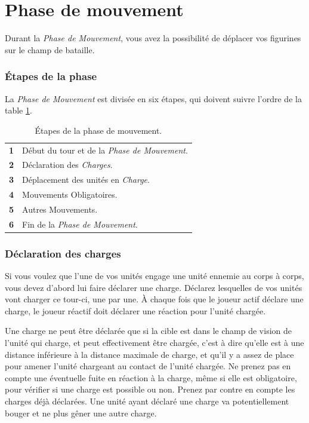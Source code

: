 
\part{Phase de mouvement}

Durant la \emph{Phase de Mouvement}, vous avez la possibilité de déplacer vos figurines sur le champ de bataille.

\section{Étapes de la phase}

La \emph{Phase de Mouvement} est divisée en six étapes, qui doivent suivre l'ordre de la table \ref{table/etapes_mouvement}.

\begin{table}[!htbp]
\centering
\begin{tabular}{c|l}
\textbf{1} & Début du tour et de la \emph{Phase de Mouvement}. \tabularnewline
\textbf{2} & Déclaration des \emph{Charges}. \tabularnewline
\textbf{3} & Déplacement des unités en \emph{Charge}. \tabularnewline
\textbf{4} & Mouvements Obligatoires. \tabularnewline
\textbf{5} & Autres Mouvements. \tabularnewline
\textbf{6} & Fin de la \emph{Phase de Mouvement}. \tabularnewline
\end{tabular}
\caption{\label{table/etapes_mouvement}Étapes de la phase de mouvement.}
\end{table}

\section{Déclaration des charges}

Si vous voulez que l'une de vos unités engage une unité ennemie au corps à corps, vous devez d'abord lui faire déclarer une charge. Déclarez lesquelles de vos unités vont charger ce tour-ci, une par une. À chaque fois que le joueur actif déclare une charge, le joueur réactif doit déclarer une réaction pour l'unité chargée.

Une charge ne peut être déclarée que si la cible est dans le champ de vision de l'unité qui charge, et peut effectivement être chargée, c'est à dire qu'elle est à une distance inférieure à la distance maximale de charge, et qu'il y a assez de place pour amener l'unité chargeant au contact de l'unité chargée. Ne prenez pas en compte une éventuelle fuite en réaction à la charge, même si elle est obligatoire, pour vérifier si une charge est possible ou non. Prenez par contre en compte les charges déjà déclarées. Une unité ayant déclaré une charge va potentiellement bouger et ne plus gêner une autre charge.

